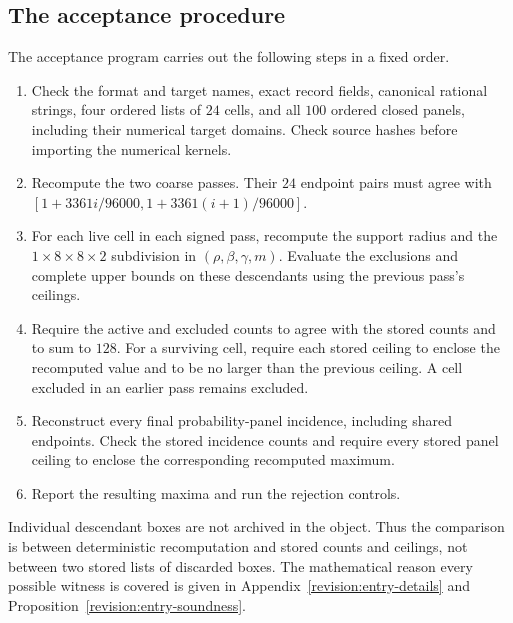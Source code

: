 \subsection{The acceptance procedure}
The acceptance program carries out the following steps in a fixed order.
\begin{enumerate}[leftmargin=*,itemsep=.35em]
\item Check the format and target names, exact record fields, canonical
rational strings, four ordered lists of $24$ cells, and all $100$ ordered
closed panels, including their numerical target domains. Check source hashes
before importing the numerical kernels.
\item Recompute the two coarse passes. Their $24$ endpoint pairs must
agree with $[1+3361i/96000,1+3361(i+1)/96000]$.
\item For each live cell in each signed pass, recompute the support
radius and the $1\times8\times8\times2$ subdivision in
$(\rho,\beta,\gamma,m)$. Evaluate the exclusions and complete upper
bounds on these descendants using the previous pass's ceilings.
\item Require the active and excluded counts to agree with the stored
counts and to sum to $128$. For a surviving cell, require each stored
ceiling to enclose the recomputed value and to be no larger than the
previous ceiling. A cell excluded in an earlier pass remains excluded.
\item Reconstruct every final probability-panel incidence, including
shared endpoints. Check the stored incidence counts and require every
stored panel ceiling to enclose the corresponding recomputed maximum.
\item Report the resulting maxima and run the rejection controls.
\end{enumerate}
Individual descendant boxes are not archived in the object. Thus the
comparison is between deterministic recomputation and stored counts and
ceilings, not between two stored lists of discarded boxes. The mathematical
reason every possible witness is covered is given in
Appendix~\ref{revision:entry-details} and
Proposition~\ref{revision:entry-soundness}.

